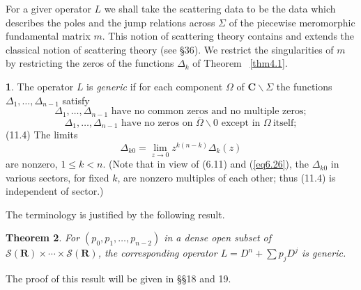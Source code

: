 \documentclass{surv-l}
\theoremstyle{plain}
\newtheorem{theorem}{Theorem}[section]
\theoremstyle{definition}
\newtheorem{definition}[theorem]{\sc{Definition}}
\numberwithin{equation}{chapter}
\begin{document}
For a giver operator $L$ we shall take the scattering data to be the data which describes the poles and the jump relations across $\Sigma$ of the piecewise meromorphic fundamental matrix $m$. This notion of scattering theory contains and extends the classical notion of scattering theory (see \S 36). We restrict the singularities of $m$ by restricting the zeros of the functions $\Delta_{k}$ of Theorem ~\ref{thm4.1}.

\begin{definition}\label{defi11.1} The operator $L$ is  \emph{generic} if for each component $\Omega$ of $ \mathbf{C}\backslash \Sigma$ the functions $\Delta_{1},\ldots,\Delta_{n-1}$ satisfy
\setcounter{equation}{1}
\begin{equation}\label{eq11.2}
\Delta_{1},\ldots, \Delta_{n-1} \text{ have no common zeros and\ no multiple zeros};
\end{equation}
\begin{equation}\label{eq11.3}
\Delta_{1},\ldots, \Delta_{n-1}\text{ have no zeros on } \overline{\Omega}\backslash 0\text{ except in } \Omega\ \mathrm{itself};
\end{equation}
(11.4) The limits
\begin{equation*}
\Delta_{k0}=\lim_{z\rightarrow 0}z^{k(n-k)}\Delta_{k}(z)
\end{equation*}
are nonzero, $1\leq k<n$. (Note that in view of (6.11) and (\ref{eq6.26}), the $\Delta_{k0}$ in various sectors, for fixed $k$, are nonzero multiples of each other; thus (11.4) is independent of sector.)

The terminology is justified by the following result.
\end{definition}
\setcounter{theorem}{4}
\begin{theorem}\label{thm11.5}  For $(p_{0},p_{1}, \ldots, p_{n-2})$  in a  dense open subset of $\mathscr{S}(\mathbf{R})\times\cdots \times \mathscr{S}(\mathbf{R})$, the corresponding operator $L=D^{n}+\sum p_{j}D^{j}$ is generic.
\end{theorem}
The proof of this result will be given in \S\S 18 and 19.
\end{document}
